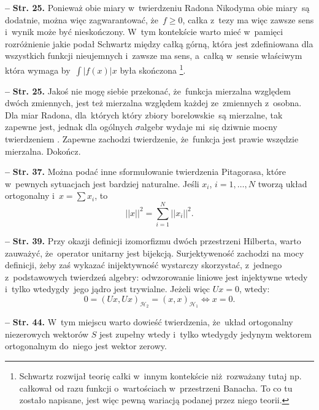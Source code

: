 \documentclass[a4paper,11pt]{article}
\newcommand{\ld}{\ldots}
\newcommand{\mc}{\mathcal}
\newcommand{\wtw}{wtedy i~tylko wtedy}
\newcommand{\si}{\sigma}
\newcommand{\Hc}{\mc{H}}
\newcommand{\Sum}{\sum\limits}
\newcommand{\Int}{\int\limits}
\newcommand{\norm}[1]{\left|\left| #1 \right|\right|}
\newcommand{\tb}{\textbf}
\newcommand{\noi}{\noindent}
\newcommand{\start}{\noi \tb{--} {}}
\newcommand{\Str}[1]{\tb{Str. #1.}}
\newcommand{\Dok}{{\color{red} Dokończ.}}
\begin{document}
\start \Str{25} Ponieważ obie miary w~twierdzeniu Radona\dywiz
Nikodyma obie
miary~są %
dodatnie, można więc zagwarantować, że~$f \geq
0$,%
całka z~tezy ma więc zawsze sens i~wynik może być nieskończony. W~tym
kontekście warto mieć w~pamięci rozróżnienie jakie podał Schwartz
między całką górną, która jest zdefiniowana dla wszystkich funkcji
nieujemnych i~zawsze ma sens, a~całką w~sensie właściwym która wymaga
by~$\Int{ | f( x ) | }{ x }$ była skończona
\cite{Sch79}\footnote{Schwartz rozwijał teorię całki w~innym
  kontekście niż~rozważany tutaj np. całkował od razu funkcji
  o~wartościach w~przestrzeni Banacha. To co tu zostało napisane, jest
  więc pewną wariacją podanej przez niego teorii.}.

\start \Str{25} Jakoś nie mogę siebie przekonać, że~funkcja mierzalna
względem dwóch zmiennych, jest też mierzalna względem każdej
ze~zmiennych z~osobna. Dla miar Radona, dla~których który
zbiory %
borelowskie~są mierzalne, tak zapewne jest, jednak dla ogólnych
$\si$\dywiz algebr wydaje mi~się dziwnie mocny
twierdzeniem %
. Zapewne zachodzi twierdzenie, że~funkcja jest prawie wszędzie
mierzalna. \Dok

\start \Str{37} Można podać inne sformułowanie twierdzenia Pitagorasa,
które w~pewnych sytuacjach jest bardziej naturalne. Jeśli $x_{ i }$,
$i = 1, \ld, N$ tworzą układ ortogonalny i~$x = \Sum x_{ i }$, to
\begin{displaymath}
  \norm{ x }^{ 2 } = \Sum_{ i = 1 }^{ N } \norm{ x_{ i } }^{ 2 }.
\end{displaymath}

\start \Str{39} Przy okazji definicji izomorfizmu dwóch przestrzeni
Hilberta, warto zauważyć, że~operator unitarny jest bijekcją.
Surjektyweność zachodzi na mocy definicji, żeby zaś wykazać
inijektywność wystarczy skorzystać, z~jednego z~podstawowych twierdzeń
algebry: odwzorowanie liniowe jest injektywne \wtw gdy~jego jądro
jest %
trywialne. Jeżeli więc $Ux = 0$, wtedy:
\begin{displaymath}
  0 = ( Ux, Ux )_{ \Hc_{ 2 } } = ( x, x )_{ \Hc_{ 1 } } \iff x = 0.
\end{displaymath}

\start \Str{44} W~tym miejscu warto dowieść twierdzenia, że~układ
ortogonalny niezerowych wektorów $S$ jest zupełny \wtw gdy
jedynym %
wektorem ortogonalnym do~niego jest wektor zerowy.
\end{document}
